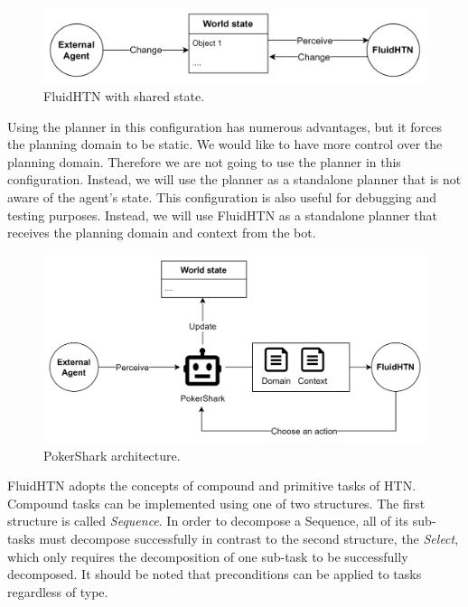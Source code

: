 \begin{figure}[h]
    \centering
    \includegraphics[width=\textwidth]{graphics/agent_3.png}
    \caption{FluidHTN with shared state.}
    \label{fig:agent}
\end{figure}

Using the planner in this configuration has numerous advantages, but it forces the planning domain to be static. We would like to have more control over the planning domain. Therefore we are not going to use the planner in this configuration. Instead, we will use the planner as a standalone planner that is not aware of the agent's state. This configuration is also useful for debugging and testing purposes. Instead, we will use FluidHTN as a standalone planner that receives the planning domain and context from the bot.

\begin{figure}[h]
    \centering
    \includegraphics[width=\textwidth]{graphics/structure.png}
    \caption{PokerShark architecture.}
    \label{fig:PokerSharkArchitecture}
\end{figure}

FluidHTN adopts the concepts of compound and primitive tasks of HTN. Compound tasks can be implemented using one of two structures. The first structure is called \textit{Sequence}. In order to decompose a Sequence, all of its sub-tasks must decompose successfully in contrast to the second structure, the \textit{Select}, which only requires the decomposition of one sub-task to be successfully decomposed. It should be noted that preconditions can be applied to tasks regardless of type.


